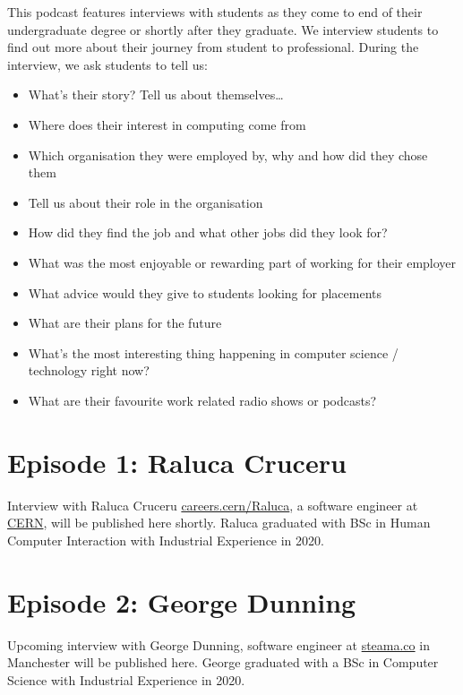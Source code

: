 \documentclass[
]{book}
\providecommand{\tightlist}{%
  \setlength{\itemsep}{0pt}\setlength{\parskip}{0pt}}
\begin{document}
This podcast features interviews with students as they come to end of their undergraduate degree or shortly after they graduate. We interview students to find out more about their journey from student to professional. During the interview, we ask students to tell us:

\begin{itemize}
\tightlist
\item
  What's their story? Tell us about themselves\ldots{}
\item
  Where does their interest in computing come from
\item
  Which organisation they were employed by, why and how did they chose them
\item
  Tell us about their role in the organisation
\item
  How did they find the job and what other jobs did they look for?
\item
  What was the most enjoyable or rewarding part of working for their employer
\item
  What advice would they give to students looking for placements
\item
  What are their plans for the future
\item
  What's the most interesting thing happening in computer science / technology right now?
\item
  What are their favourite work related radio shows or podcasts?
\end{itemize}

\hypertarget{episode-1-raluca-cruceru}{%
\section{Episode 1: Raluca Cruceru}\label{episode-1-raluca-cruceru}}

Interview with Raluca Cruceru \href{https://careers.cern/Raluca}{careers.cern/Raluca}, a software engineer at \href{https://home.cern/}{CERN}, will be published here shortly. Raluca graduated with BSc in Human Computer Interaction with Industrial Experience in 2020.

\hypertarget{episode-2-george-dunning}{%
\section{Episode 2: George Dunning}\label{episode-2-george-dunning}}

Upcoming interview with George Dunning, software engineer at \href{https://steama.co/}{steama.co} in Manchester will be published here. George graduated with a BSc in Computer Science with Industrial Experience in 2020.
\end{document}
